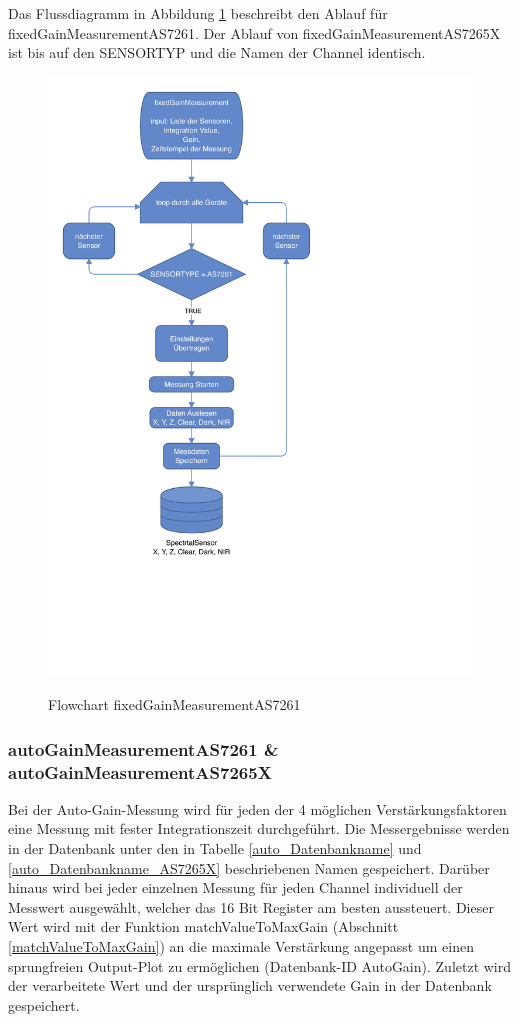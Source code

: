\noindent Das Flussdiagramm in Abbildung \ref{fig:manualGain} beschreibt den Ablauf für fixedGainMeasurementAS7261.
Der Ablauf von fixedGainMeasurementAS7265X ist bis auf den SENSORTYP und die Namen der Channel identisch.

\begin{figure}[H]
  \centering
    \caption{Flowchart fixedGainMeasurementAS7261}
 \includegraphics[width=0.8\linewidth]{img/manualGain}
  \label{fig:manualGain}
\end{figure}


\subsubsection{autoGainMeasurementAS7261 \& autoGainMeasurementAS7265X}
Bei der Auto-Gain-Messung wird für jeden der 4 möglichen Verstärkungsfaktoren eine Messung mit fester Integrationszeit durchgeführt.
Die Messergebnisse werden in der Datenbank unter den in Tabelle \ref{auto_Datenbankname} und \ref{auto_Datenbankname_AS7265X} beschriebenen Namen gespeichert.
Darüber hinaus wird bei jeder einzelnen Messung für jeden Channel individuell der Messwert ausgewählt, welcher das 16 Bit Register am besten aussteuert.
Dieser Wert wird mit der Funktion matchValueToMaxGain (Abschnitt \ref{matchValueToMaxGain}) an die maximale Verstärkung angepasst um einen sprungfreien Output-Plot zu ermöglichen (Datenbank-ID AutoGain).
Zuletzt wird der verarbeitete Wert und der ursprünglich verwendete Gain in der Datenbank gespeichert.




